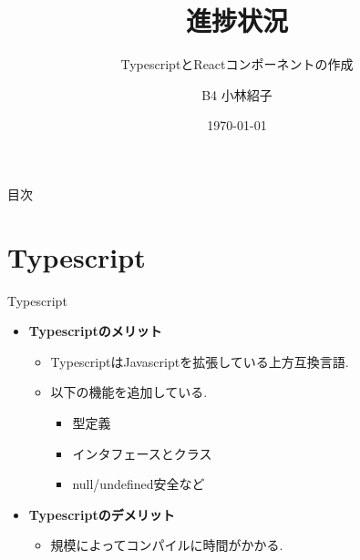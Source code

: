 \documentclass[aspectratio=169]{beamer}
\begin{document}
\title{進捗状況}
\subtitle{TypescriptとReactコンポーネントの作成} 
\author{\small B4 小林紹子} %
\date{\small\today} %

\begin{frame}
    \titlepage
\end{frame}

\begin{frame}{目次}
    \tableofcontents
\end{frame}



\section{Typescript}

\begin{frame}{Typescript}
    \begin{itemize}
        \setlength{\itemsep}{1.5em} 
        \item \textbf{Typescriptのメリット}\\
        \begin{itemize}
            \setlength{\itemsep}{1.5em} 
            \item TypescriptはJavascriptを拡張している上方互換言語.
            \item 以下の機能を追加している.
            \begin{itemize}
                \item 型定義
                \item インタフェースとクラス
                \item null/undefined安全など
            \end{itemize}
        \end{itemize}
        \item \textbf{Typescriptのデメリット}
        \begin{itemize}
            \item 規模によってコンパイルに時間がかかる.
        \end{itemize}
    \end{itemize}
\end{frame}
\end{document}

